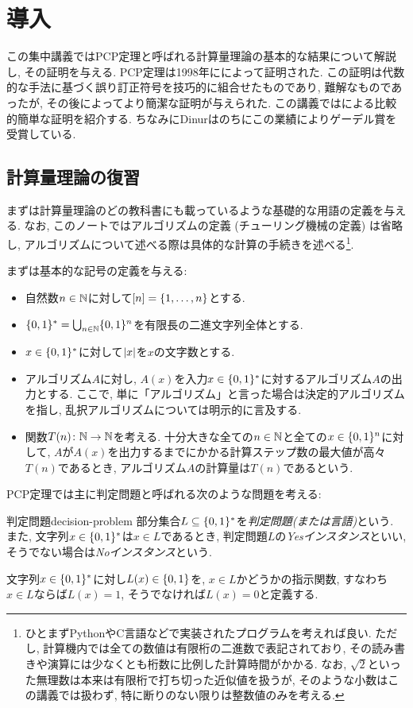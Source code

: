 \chapter{導入}

この集中講義ではPCP定理と呼ばれる計算量理論の基本的な結果について解説し, その証明を与える.
PCP定理は1998年に\citet{AroraS98,AroraLMSS98}によって証明された.
この証明は代数的な手法に基づく誤り訂正符号を技巧的に組合せたものであり, 難解なものであったが, その後\citet{Din07}によってより簡潔な証明が与えられた.
この講義では\citet{Din07}による比較的簡単な証明を紹介する.
ちなみにDinurはのちにこの業績によりゲーデル賞を受賞している.

\section{計算量理論の復習}
まずは計算量理論のどの教科書にも載っているような基礎的な用語の定義を与える.
なお, このノートではアルゴリズムの定義 (チューリング機械の定義) は省略し, アルゴリズムについて述べる際は具体的な計算の手続きを述べる\footnote{ひとまずPythonやC言語などで実装されたプログラムを考えれば良い. ただし, 計算機内では全ての数値は有限桁の二進数で表記されており, その読み書きや演算には少なくとも桁数に比例した計算時間がかかる. なお, $\sqrt{2}$といった無理数は本来は有限桁で打ち切った近似値を扱うが, そのような小数はこの講義では扱わず, 特に断りのない限りは整数値のみを考える.}.

まずは基本的な記号の定義を与える:
\begin{itemize}
\item 自然数$n\in\mathbb{N}$に対して$[n]=\qty{1,\dots,n}$とする.
\item $\{0,1\}^*=\bigcup_{n\in\mathbb{N}}\{0,1\}^n$を有限長の二進文字列全体とする.
\item $x\in\{0,1\}^*$に対して$\abs{x}$を$x$の文字数とする.
\item アルゴリズム$A$に対し, $A(x)$を入力$x \in \{0,1\}^*$に対するアルゴリズム$A$の出力とする. ここで, 単に「アルゴリズム」と言った場合は決定的アルゴリズムを指し, 乱択アルゴリズムについては明示的に言及する.
\item 関数$T(n)\colon\mathbb{N}\to\mathbb{N}$を考える. 十分大きな全ての$n\in\mathbb{N}$と全ての$x\in\{0,1\}^n$に対して, $A$が$A(x)$を出力するまでにかかる計算ステップ数の最大値が高々$T(n)$であるとき, アルゴリズム$A$の計算量は$T(n)$であるという.
\end{itemize}

PCP定理では主に判定問題と呼ばれる次のような問題を考える:

\begin{definition}{判定問題}{decision-problem}
  部分集合$L\subseteq\{0,1\}^*$を\emph{判定問題(または言語)}という.
  また, 文字列$x\in\{0,1\}^*$は$x\in L$であるとき, 判定問題$L$の\emph{Yesインスタンス}といい,
  そうでない場合は\emph{Noインスタンス}という.

  文字列$x\in\{0,1\}^*$に対し$L(x)\in\{0,1\}$を, $x\in L$かどうかの指示関数, すなわち$x\in L$ならば$L(x)=1$, そうでなければ$L(x)=0$と定義する.
\end{definition}

